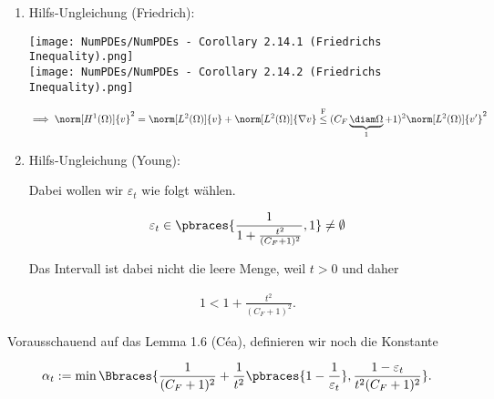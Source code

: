 \begin{solution}
\begin{enumerate}[label = \textbf{\alph*)}]
\begin{enumerate}[label = \arabic*.]
    \begin{enumerate}[label = \arabic*.]

      \item Hilfs-Ungleichung (Friedrich):

      \begin{center}
        \texttt{[image: NumPDEs/NumPDEs - Corollary 2.14.1 (Friedrichs Inequality).png]} \\
        \texttt{[image: NumPDEs/NumPDEs - Corollary 2.14.2 (Friedrichs Inequality).png]}
      \end{center}

      \begin{align*}
        \implies
        \norm[H^1(\Omega)]{v}^2
        =
        \norm[L^2(\Omega)]{v}
        +
        \norm[L^2(\Omega)]{\nabla v}
        \stackrel
        {
          \mathrm{F}
        }{\leq}
        (
          C_F
          \underbrace{\diam \Omega}_1
          +
          1
        )^2
        \norm[L^2(\Omega)]{v^\prime}^2
      \end{align*}

      \item Hilfs-Ungleichung (Young):
      
      Dabei wollen wir $\varepsilon_t$ wie folgt wählen.

      \begin{align*}
        \varepsilon_t
        \in
        \pbraces
        {
          \frac{1}
          {
            1
            +
            \frac{t^2}{(C_F + 1)^2}
          },
          1
        }
        \neq
        \emptyset
      \end{align*}

      Das Intervall ist dabei nicht die leere Menge, weil $t > 0$ und daher

      \begin{align*}
        1 < 1 + \frac{t^2}{(C_F + 1)^2}.
      \end{align*}

    \end{enumerate}

    Vorausschauend auf das Lemma 1.6 (Céa), definieren wir noch die Konstante

    \begin{align*}
      \alpha_t
      :=
      \min
      \Bbraces
      {
        \frac{1}{(C_F + 1)^2}
        +
        \frac{1}{t^2}
        \pbraces
        {
          1 - \frac{1}{\varepsilon_t}
        },
        \frac
        {
          1 - \varepsilon_t
        }{
          t^2 (C_F + 1)^2
        }
      }.
    \end{align*}


\end{enumerate}
\end{enumerate}
\end{solution}
